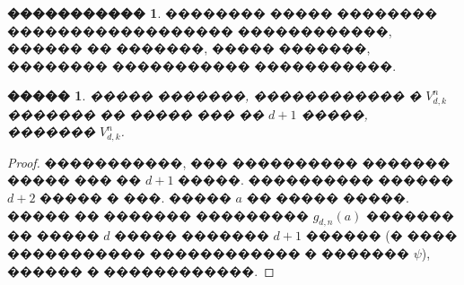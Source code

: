 \documentclass[16pt]{article}
\theoremstyle{plain}
\newtheorem{lemma}[theorem]{�����}
\theoremstyle{definition}
\newtheorem{definition}[theorem]{�����������}
\theoremstyle{remark}
\begin{document}
\begin{definition}
�������� ����� �������� ������������������ ������������, ������  �� �������, ����� �������, �������� ����������� �����������.
\end{definition}

\begin{lemma}\label{lemma:o_konechnosti_cepochek}
����� �������, ������������ � ${V}_{d,k}^{n}$ ������� �� ����� ��� ��  $d+1$ �����, ������� ${V}_{d,k}^{n}$.
\end{lemma}

\begin{proof}
�����������, ���  ���������� ������� ����� ��� �� $d+1$ �����. ���������� ������ $d+2$  ����� � ���. ����� $a$ �� ����� �����. ����� �� ������� ��������� $g_{d,n}(a)$ ������� �� ����� $d$ ����� ������� $d+1$  ������ (� ���� ����������� ������������ � ������� $\psi$), ������ � ������������.
\end{proof}
\end{document}
